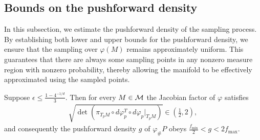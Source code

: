
\subsection{Bounds on the pushforward density}
\label{sec:density}

In this subsection, we estimate the pushforward density of the sampling process. By establishing both lower and upper bounds for the pushforward density, we ensure that the sampling over $\varphi(M)$ remains approximately uniform. This guarantees that there are always some sampling points in any nonzero measure region with nonzero probability, thereby allowing the manifold to be effectively approximated using the sampled points.

\begin{lemma}
	\label{lem:density-bound}
	Suppose $\epsilon \leq \frac{1-4^{-1/d}}{3}$. Then for every $M \in \mathcal{M}$ the Jacobian factor of $\varphi$ satisfies
	\begin{align}
		\sqrt{\det \left(\pi_{T_p M} \circ d\varphi_p^T \circ d\varphi_p |_{T_pM}\right)} \in \left(\tfrac{1}{2},2\right),
	\end{align}
	and consequently the pushforward density $g$ of $\varphi_\# P$ obeys $\tfrac{f_{\min}}{2} < g < 2 f_{\max}$. 
\end{lemma}

